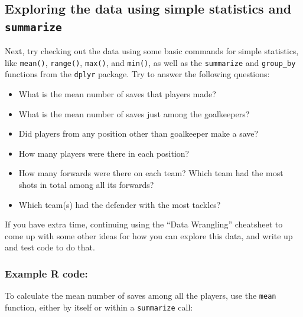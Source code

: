\documentclass[]{book}
\makeatletter
\newenvironment{Shaded}{\begin{snugshade}}{\end{snugshade}}
\newcommand{\KeywordTok}[1]{\textcolor[rgb]{0.13,0.29,0.53}{\textbf{#1}}}
\newcommand{\OperatorTok}[1]{\textcolor[rgb]{0.81,0.36,0.00}{\textbf{#1}}}
\newcommand{\NormalTok}[1]{#1}
\providecommand{\tightlist}{%
  \setlength{\itemsep}{0pt}\setlength{\parskip}{0pt}}
\newenvironment{kframe}{%
\medskip{}
\setlength{\fboxsep}{.8em}
 \def\at@end@of@kframe{}%
 \ifinner\ifhmode%
  \def\at@end@of@kframe{\end{minipage}}%
  \begin{minipage}{\columnwidth}%
 \fi\fi%
 \def\FrameCommand##1{\hskip\@totalleftmargin \hskip-\fboxsep
 \colorbox{shadecolor}{##1}\hskip-\fboxsep
     \hskip-\linewidth \hskip-\@totalleftmargin \hskip\columnwidth}%
 \MakeFramed {\advance\hsize-\width
   \@totalleftmargin\z@ \linewidth\hsize
   \@setminipage}}%
 {\par\unskip\endMakeFramed%
 \at@end@of@kframe}
\renewenvironment{Shaded}{\begin{kframe}}{\end{kframe}}
\theoremstyle{definition}
\theoremstyle{definition}
\theoremstyle{definition}
\theoremstyle{remark}
\makeatother
\begin{document}
\subsection{\texorpdfstring{Exploring the data using simple statistics
and
\texttt{summarize}}{Exploring the data using simple statistics and summarize}}\label{exploring-the-data-using-simple-statistics-and-summarize}

Next, try checking out the data using some basic commands for simple
statistics, like \texttt{mean()}, \texttt{range()}, \texttt{max()}, and
\texttt{min()}, as well as the \texttt{summarize} and \texttt{group\_by}
functions from the \texttt{dplyr} package. Try to answer the following
questions:

\begin{itemize}
\tightlist
\item
  What is the mean number of saves that players made?
\item
  What is the mean number of saves just among the goalkeepers?
\item
  Did players from any position other than goalkeeper make a save?
\item
  How many players were there in each position?
\item
  How many forwards were there on each team? Which team had the most
  shots in total among all its forwards?
\item
  Which team(s) had the defender with the most tackles?
\end{itemize}

If you have extra time, continuing using the ``Data Wrangling''
cheatsheet to come up with some other ideas for how you can explore this
data, and write up and test code to do that.

\subsubsection{Example R code:}\label{example-r-code-2}

To calculate the mean number of saves among all the players, use the
\texttt{mean} function, either by itself or within a \texttt{summarize}
call:

\begin{Shaded}
\end{Shaded}
\end{document}
